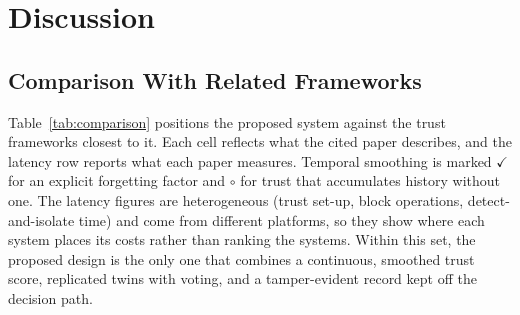 \documentclass{ieeeaccess}
\begin{document}
\section{Discussion}
\label{sec:discussion}

\subsection{Comparison With Related Frameworks}
\label{sec:res-comparison}
Table~\ref{tab:comparison} positions the proposed system against the
trust frameworks closest to it.  Each cell reflects what the cited
paper describes, and the latency row reports what each paper measures.
Temporal smoothing is marked $\checkmark$ for an explicit forgetting
factor and $\circ$ for trust that accumulates history without one.
The latency figures are heterogeneous (trust set-up, block operations,
detect-and-isolate time) and come from different platforms, so they
show where each system places its costs rather than ranking the
systems.  Within this set, the proposed design is the only one that
combines a continuous, smoothed trust score, replicated twins with
voting, and a tamper-evident record kept off the decision path.
\end{document}
